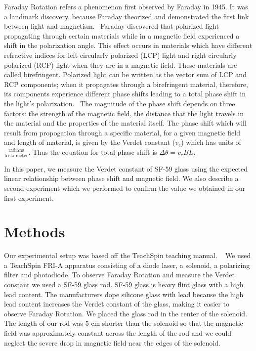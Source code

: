 \documentclass[prb,preprint]{revtex4-1}
\begin{document}
Faraday Rotation refers a phenomenon first observed by Faraday in 1945. It was a landmark discovery, because Faraday theorized and demonstrated the first link between light and magnetism.~\cite{teachspin} Faraday discovered that polarized light propagating through certain materials while in a magnetic field experienced a shift in the polarization angle. This effect occurs in materials which have different refractive indices for left circularly polarized (LCP) light and right circularly polarized (RCP) light when they are in a magnetic field. These materials are called birefringent. Polarized light can be written as the vector sum of LCP and RCP components; when it propagates through a birefringent material, therefore, its components experience different phase shifts leading to a total phase shift in the light's polarization.~\cite{melissanos} The magnitude of the phase shift depends on three factors: the strength of the magnetic field, the distance that the light travels in the material and the properties of the material itself. The phase shift which will result from propogation through a specific material, for a given magnetic field and length of material, is given by the Verdet constant ($v_c$) which has units of $\frac{\text{radians}}{\text{tesla\ meter}}$. Thus the equation for total phase shift is $\Delta \theta = v_c B L$.

In this paper, we measure the Verdet constant of SF-59 glass using the expected linear relationship between phase shift and magnetic field. We also describe a second experiment which we performed to confirm the value we obtained in our first experiment.

\section{Methods}

Our experimental setup was based off the TeachSpin teaching manual. ~\cite{teachspin} We used a TeachSpin FRI-A apparatus consisting of a diode laser, a solenoid, a polarizing filter and photodiode. To observe Faraday Rotation and measure the Verdet constant we used a SF-59 glass rod. SF-59 glass is heavy flint glass with a high lead content. The manufacturers dope silicone glass with lead because the high lead content increases the Verdet constant of the glass, making it easier to observe Faraday Rotation.\cite{opticalglass} We placed the glass rod in the center of the solenoid. The length of our rod was 5 cm shorter than the solenoid so that the magnetic field was approximately constant across the length of the rod and we could neglect the severe drop in magnetic field near the edges of the solenoid.
\end{document}
